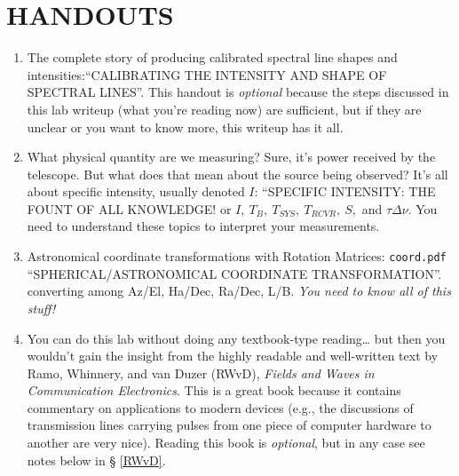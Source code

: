 \documentclass[12pt,preprint]{aastex}
\begin{document}
\section{HANDOUTS} \label{handouts}
\begin{enumerate}

\item The complete story of producing calibrated spectral line shapes
  and intensities:``CALIBRATING THE INTENSITY AND SHAPE OF SPECTRAL
  LINES''. This handout is {\it optional} because the steps discussed in
  this lab writeup (what you're reading now) are sufficient, but
  if they are unclear or you want to know more, this writeup has it all.

\item What physical quantity are we measuring? Sure, it's power received
  by the telescope. But what does that mean about the source being
  observed? It's all about specific intensity, usually denoted $I$:
  ``SPECIFIC INTENSITY: THE FOUNT OF ALL KNOWLEDGE! or $I,
    \ T_B, \ T_{SYS}, \ T_{RCVR}, \ S,$ and $\tau \Delta \nu$. You need
  to understand these topics to interpret your measurements.

\item Astronomical coordinate transformations with Rotation Matrices:
  {\tt coord.pdf} ``SPHERICAL/ASTRONOMICAL COORDINATE
  TRANSFORMATION''. converting among Az/El, Ha/Dec, Ra/Dec, L/B. {\it
    You need to know all of this stuff!}

\item You can do this lab without doing any textbook-type reading\dots
  but then you wouldn't gain the insight from the highly readable and
  well-written text by Ramo, Whinnery, and van Duzer (RWvD), {\it Fields
    and Waves in Communication Electronics}. This is a great book
  because it contains commentary on applications to modern devices
  (e.g., the discussions of transmission lines carrying pulses from one
  piece of computer hardware to another are very nice).  Reading this
  book is {\it optional}, but in any case see notes below in \S
  \ref{RWvD}.

\end{enumerate}
\end{document}
